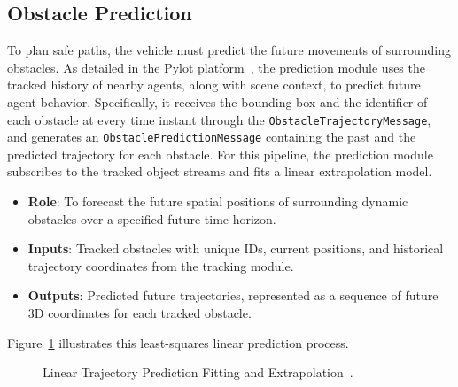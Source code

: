 \documentclass[11pt,a4paper]{report}
\begin{document}
\subsection{Obstacle Prediction}
To plan safe paths, the vehicle must predict the future movements of surrounding obstacles. As detailed in the Pylot platform~\cite{erdos_pylot}, the prediction module uses the tracked history of nearby agents, along with scene context, to predict future agent behavior. Specifically, it receives the bounding box and the identifier of each obstacle at every time instant through the \texttt{ObstacleTrajectoryMessage}, and generates an \texttt{ObstaclePredictionMessage} containing the past and the predicted trajectory for each obstacle. For this pipeline, the prediction module subscribes to the tracked object streams and fits a linear extrapolation model. 
\begin{itemize}
    \item \textbf{Role}: To forecast the future spatial positions of surrounding dynamic obstacles over a specified future time horizon.
    \item \textbf{Inputs}: Tracked obstacles with unique IDs, current positions, and historical trajectory coordinates from the tracking module.
    \item \textbf{Outputs}: Predicted future trajectories, represented as a sequence of future 3D coordinates for each tracked obstacle.
\end{itemize}
Figure~\ref{fig:linear_prediction} illustrates this least-squares linear prediction process.

\begin{figure}[H]
\centering
{}
\caption{Linear Trajectory Prediction Fitting and Extrapolation~\cite{erdos_pylot}.}
\label{fig:linear_prediction}
\end{figure}
\end{document}
